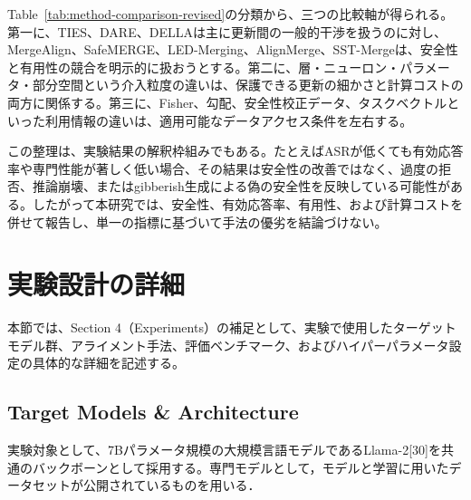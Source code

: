\documentclass{article}
\begin{document}
Table~\ref{tab:method-comparison-revised}の分類から、三つの比較軸が得られる。
第一に、TIES、DARE、DELLAは主に更新間の一般的干渉を扱うのに対し、MergeAlign、SafeMERGE、LED-Merging、AlignMerge、SST-Mergeは、安全性と有用性の競合を明示的に扱おうとする。第二に、層・ニューロン・パラメータ・部分空間という介入粒度の違いは、保護できる更新の細かさと計算コストの両方に関係する。第三に、Fisher、勾配、安全性校正データ、タスクベクトルといった利用情報の違いは、適用可能なデータアクセス条件を左右する。

この整理は、実験結果の解釈枠組みでもある。たとえばASRが低くても有効応答率や専門性能が著しく低い場合、その結果は安全性の改善ではなく、過度の拒否、推論崩壊、またはgibberish生成による偽の安全性を反映している可能性がある。したがって本研究では、安全性、有効応答率、有用性、および計算コストを併せて報告し、単一の指標に基づいて手法の優劣を結論づけない。

\section{実験設計の詳細}
\label{app:実験設計の詳細}
本節では、Section 4（Experiments）の補足として、実験で使用したターゲットモデル群、アライメント手法、評価ベンチマーク、およびハイパーパラメータ設定の具体的な詳細を記述する。

\subsection{Target Models \& Architecture}
実験対象として、7Bパラメータ規模の大規模言語モデルであるLlama-2[30]を共通のバックボーンとして採用する。専門モデルとして，モデルと学習に用いたデータセットが公開されているものを用いる．
\end{document}

